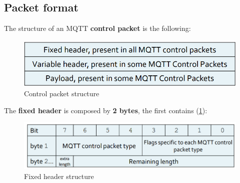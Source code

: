\documentclass[10pt,a4paper]{report}
\theoremstyle{definition}
\begin{document}
\subsection{Packet format}\label{sec:packet-format}
The structure of an MQTT \textbf{control packet} is the following:
\begin{figure}[h!]
	\centering\includegraphics[scale=0.50]{images/Pasted image 20230304101920.png}
	\caption{Control packet structure}
\end{figure}

The \textbf{fixed header} is composed by \textbf{2 bytes}, the first contains (\ref{fixed-header-bytes}):
\begin{figure}[h]
	\centering
	\includegraphics[scale=0.35]{images/Pasted image 20230304101933.png}
	\caption{Fixed header structure}\label{fixed-header-bytes}
\end{figure}
\end{document}
